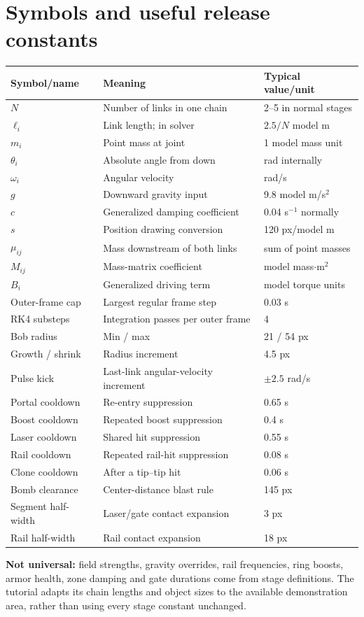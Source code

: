 \documentclass[11pt,a4paper]{article}
\newcommand{\code}[1]{\texttt{\detokenize{#1}}}
\begin{document}
\section{Symbols and useful release constants}
\begin{longtable}{p{.19\linewidth}p{.44\linewidth}p{.27\linewidth}}
\toprule\textbf{Symbol/name}&\textbf{Meaning}&\textbf{Typical value/unit}\\\midrule\endhead
\(N\)&Number of links in one chain&2--5 in normal stages\\
\(\ell_i\)&Link length; \code{L[i]} in solver&\(2.5/N\) model m\\
\(m_i\)&Point mass at joint&1 model mass unit\\
\(\theta_i\)&Absolute angle from down&rad internally\\
\(\omega_i\)&Angular velocity&rad/s\\
\(g\)&Downward gravity input&9.8 model m/s\(^2\)\\
\(c\)&Generalized damping coefficient&0.04 s\(^{-1}\) normally\\
\(s\)&Position drawing conversion&120 px/model m\\
\(\mu_{ij}\)&Mass downstream of both links&sum of point masses\\
\(M_{ij}\)&Mass-matrix coefficient&model mass\(\cdot\)m\(^2\)\\
\(B_i\)&Generalized driving term&model torque units\\
Outer-frame cap&Largest regular frame step&0.03 s\\
RK4 substeps&Integration passes per outer frame&4\\
Bob radius&Min / max&21 / 54 px\\
Growth / shrink&Radius increment&4.5 px\\
Pulse kick&Last-link angular-velocity increment&\(\pm2.5\) rad/s\\
Portal cooldown&Re-entry suppression&0.65 s\\
Boost cooldown&Repeated boost suppression&0.4 s\\
Laser cooldown&Shared hit suppression&0.55 s\\
Rail cooldown&Repeated rail-hit suppression&0.08 s\\
Clone cooldown&After a tip--tip hit&0.06 s\\
Bomb clearance&Center-distance blast rule&145 px\\
Segment half-width&Laser/gate contact expansion&3 px\\
Rail half-width&Rail contact expansion&18 px\\\bottomrule
\end{longtable}
\textbf{Not universal:} field strengths, gravity overrides, rail frequencies, ring boosts, armor health, zone damping and gate durations come from stage definitions. The tutorial adapts its chain lengths and object sizes to the available demonstration area, rather than using every stage constant unchanged.
\end{document}
